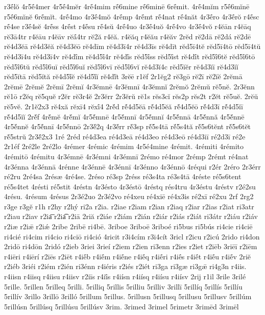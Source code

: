 {r3ḗlŏ
4r5ḗ4mer
4r5ḗ4mĕr
4rḗ4mim
rḗ6mine
rḗ6minē
6rḗmit.
4rḗ4mĭm
r5ḗ6mĭnē
r5ḗ6mĭnĕ
6rḗmĭt.
4rḗ4mo
4r3ḗ4mŏ
4rḗmp
4rḗmt
rḗ4nat
rḗ4năt
4r3ḗro
4r3ḗrŏ
r4ḗsc
rḗ4se
r3ḗ4sĕ
4rḗss
4rḗst
r4ḗsu
rḗ4sŭ
4rḗ4uo
4r3ḗ4uŏ
4rḗ4vo
4r3ḗ4vŏ
r4ĕān
r4ĕāq
rĕ3ā4tr
r4ĕāu
r4ĕāv
rĕā́4tr
rĕ2ă
r4ĕă.
r4ĕăq
r4ĕău
r4ĕăv
2rĕd
rĕ2dā
rĕ2dá
rĕ2dē
rĕ4d3ĕā
rĕ4d3ĕă
rĕ4d3ĕō
rĕ4dīm
rĕ4d3ī4r
rĕ4d3īs
rĕ4dīt
rĕd5ī4tĕ
rĕd5ī4tō
rĕd5ī4tŭ
rĕ4d3ī4u
rĕ4d3ī4v
rĕ4dī́m
rĕ4d5ī́4r
rĕ4dī́s
rĕd5ī́ss
rĕd5ī́st
rĕ4dī́t
rĕd5ī́6tĕ
rĕd5ī́6tō
rĕd5ī́6tŭ
rĕd5ī́6uī
rĕd5ī́6uĭ
rĕd5ī́6vī
rĕd5ī́6vĭ
rĕ4d3ĭ4c
rĕd5ĭĕr
rĕ4d3ĭī
rĕ4d3ĭĭ
rĕd5ĭtā
rĕd5ĭtă
rĕ4d5ĭ́ĕ
rĕ4d5ĭ́ĭ
rĕ4dĭ́t
3rĕē
r1ĕf
2r1ĕg2
rĕ3gō
rĕ2ī
rĕ2ĭĕ
2rĕmā
2rĕmē
2rĕmĕ
2rĕmī
2rĕmĭ
4r3ĕmnē
4r3ĕmnī
4r3ĕmnĭ
2rĕmŏ
2rĕmŭ
rĕ5nĕ.
2r3ĕnn
rĕ1ō
r2ĕq
rĕ5quĕ
r2ĕr
rĕ3r4ĕ
2r3ĕrr
2r3ĕrŭ
rĕ1s
rĕs3cĭ
rĕs2p
rĕs2t
r2ĕt
rĕ5uĕ.
2rĕŭ
rĕ5vĕ.
2r1ĕ2x3
rĕ4xă
rĕxī4
rĕxī́4
2rĕ́d
rĕ́4d5ĕā
rĕ́4d5ĕă
rĕ́4d5ĕō
rĕ́4d3ī
rĕ́4d5ĭī
rĕ́4d5ĭĭ
2rĕ́f
4rĕ́mĕ
4rĕ́mĭ
4r5ĕ́mnē
4r5ĕ́mnī
4r5ĕ́mnĭ
4r5ĕ́nnā
4r5ĕ́nnă
4r5ĕ́nnē
4r5ĕ́nnĕ
4r5ĕ́nnī
4r5ĕ́nnō
2r3ĕ́2q
4r3ĕ́rr
rĕ́3sp
rĕ́5s4tā
rĕ́5s4tă
rĕ́5s6tĕnt
rĕ́5s6tĕt
rĕ́5strŭ
2r3ĕ́2x3
1ré
2réd
ré4d3ea
ré4d3eā
ré4d3eo
ré4d3eō
ré4d3iī
ré2d3ī
ré2e
2r1éf
2ré2le
2ré2lo
4rémer
4rémic
4rémim
4r5é4mine
4rémit.
4rémiti
4rémito
4rémitō
4rémitu
4r3émnē
4r3émni
4r3émnī
2rémo
ré4mor
2rémp
2rémt
ré4nat
4r3énna
4r3énnā
4rénne
4r3énnē
4r3énnī
4r3énno
4r3énnō
4réqui
r2ér
2réro
2r3érr
ré2ru
2ré4sa
2résæ
4ré4se.
2réso
ré3sp
2réss
ré3s4ta
ré3s4tā
4réste
ré5s6tent
ré5s4tet
4résti
ré5stit
4réstn
4r3ésto
4r3éstō
4réstq
rés4tru
4r3éstu
4réstv
r2é2su
4résu.
4résum
4résus
2r3é2uo
2r3é2vo
ré4xeu
ré4xiē
ré4x3is
ré2xī
ré2xu
2rf
2rg2
r3ge
r3gĕ
r1h
r2hy
r2hý
ri2a
r2ia.
r2iae
r2iam
r2ian
r2iaq
r2iar
r2ias
r2iat
ri3atr
r2iau
r2iav
r2ia͞
r2ia͡
r2iā
2riă
r2iáe
r2iám
r2ián
r2iár
r2iás
r2iát
ri3átr
r2iáu
r2iáv
r2iæ
r2iǣ
r2iǽ
2ribe
2ribē
ri4bē.
3riboe
3riboē
3riboé
ri5bus
ri5bús
ri4cie
ri4ciē
ri4cié
ri4cim
ri4cio
ri4ciō
ri4ció
4ricit
r3i4cím
r3i4cít
3ricl
r2icu
r2icú
2rido
ri4don
2ridō
ri4dōn
2ridó
r2ieb
3riei
3rieí
r2iem
r2ien
ri3enn
r2ies
r2iet
r2iēb
3riēī
r2iēm
r4iēri
r4iērí
r2iēs
r2iēt
r4iḗb
r4iḗm
r4iḗne
r4iḗq
r4iḗri
r4iḗs
r4iḗt
r4iḗu
r4iḗv
2riĕ
r2iéb
3riéi
r2iém
r2ién
ri3énn
r4iéris
r2iés
r2iét
ri3ga
ri3gæ
ri3gǣ
ri4g3n
r4iis.
r4iisn
r4iisq
r4iisu
r4iisv
r2iīs
r4iī́s
r4iísn
r4iísq
r4iísu
r4iísv
2rij
r1il
3rile
3rilé
5rille.
5rillen
5rilleq
5rilli.
5rilliq
5rillis
5rilliu
5rilliv
3rillī
5rillíq
5rillís
5rillíu
5rillív
3rillo
3rillō
3rilló
5rillum
5rillus.
5rillusn
5rillusq
5rillusu
5rillusv
5rillúm
5rillúsn
5rillúsq
5rillúsu
5rillúsv
3rim.
3rimed
3rimel
5rimetr
3rimēd
3rimēl
}
